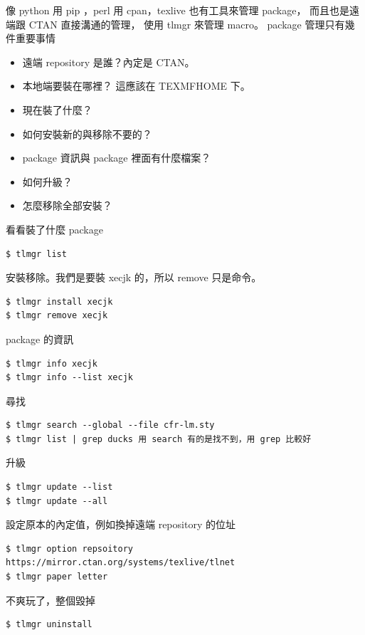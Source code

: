 像 python 用 pip ，perl 用 cpan，texlive 也有工具來管理 package，
而且也是遠端跟 CTAN 直接溝通的管理， 使用 tlmgr 來管理 macro。
package 管理只有幾件重要事情
\begin{itemize}
\item 遠端 repository 是誰？內定是 CTAN。
\item 本地端要裝在哪裡？ 這應該在 TEXMFHOME 下。
\item 現在裝了什麼？
\item 如何安裝新的與移除不要的？
\item package 資訊與 package 裡面有什麼檔案？
\item 如何升級？
\item 怎麼移除全部安裝？
\end{itemize}
看看裝了什麼 package
\begin{verbatim}
$ tlmgr list
\end{verbatim}
安裝移除。我們是要裝 xecjk 的，所以 remove 只是命令。
\begin{verbatim}
$ tlmgr install xecjk
$ tlmgr remove xecjk
\end{verbatim}
package 的資訊
\begin{verbatim}
$ tlmgr info xecjk
$ tlmgr info --list xecjk
\end{verbatim}
尋找
\begin{verbatim}
$ tlmgr search --global --file cfr-lm.sty
$ tlmgr list | grep ducks 用 search 有的是找不到，用 grep 比較好
\end{verbatim}
升級
\begin{verbatim}
$ tlmgr update --list
$ tlmgr update --all
\end{verbatim}
設定原本的內定值，例如換掉遠端 repository 的位址
\begin{verbatim}
$ tlmgr option repsoitory https://mirror.ctan.org/systems/texlive/tlnet
$ tlmgr paper letter
\end{verbatim}
不爽玩了，整個毀掉
\begin{verbatim}
$ tlmgr uninstall
\end{verbatim}

